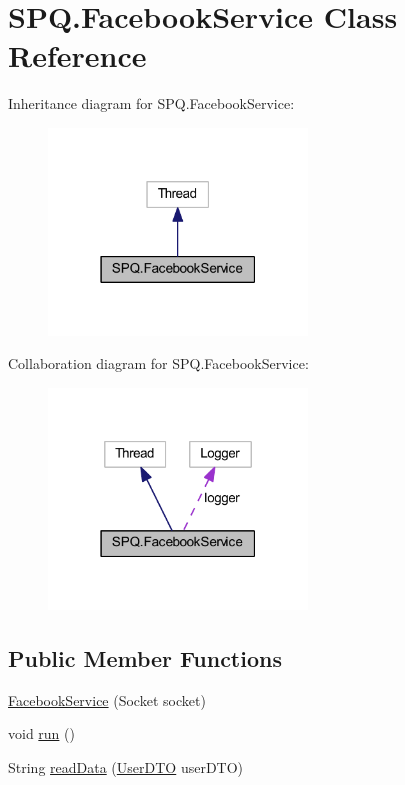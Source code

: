 \hypertarget{class_s_p_q_1_1_facebook_service}{}\section{S\+P\+Q.\+Facebook\+Service Class Reference}
\label{class_s_p_q_1_1_facebook_service}


Inheritance diagram for S\+P\+Q.\+Facebook\+Service\+:
\nopagebreak
\begin{figure}[H]
\begin{center}
\leavevmode
\includegraphics[width=195pt]{class_s_p_q_1_1_facebook_service__inherit__graph}
\end{center}
\end{figure}


Collaboration diagram for S\+P\+Q.\+Facebook\+Service\+:
\nopagebreak
\begin{figure}[H]
\begin{center}
\leavevmode
\includegraphics[width=195pt]{class_s_p_q_1_1_facebook_service__coll__graph}
\end{center}
\end{figure}
\subsection*{Public Member Functions}
\begin{DoxyCompactItemize}
\item 
\mbox{\hyperlink{class_s_p_q_1_1_facebook_service_a87c0122d98acc55bde0e958f59916887}{Facebook\+Service}} (Socket socket)
\item 
void \mbox{\hyperlink{class_s_p_q_1_1_facebook_service_a24a62bc6a32966419548314bc417abfb}{run}} ()
\item 
String \mbox{\hyperlink{class_s_p_q_1_1_facebook_service_a087e3aab2d870149c0ef74f3adf75efa}{read\+Data}} (\mbox{\hyperlink{class_s_p_q_1_1dto_1_1_user_d_t_o}{User\+D\+TO}} user\+D\+TO)
\end{DoxyCompactItemize}


